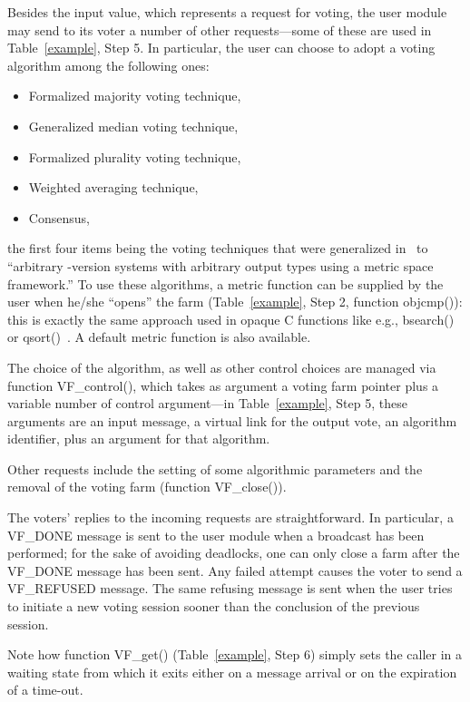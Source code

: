 \documentclass[11pt]{article}
\begin{document}
Besides the input value, which represents a request for voting,
the user module may send to its voter a number of other requests---some 
of these are used in Table~\ref{example}, Step 5. In particular, the user
can choose to adopt a voting algorithm among the following ones:
\begin{itemize}
\item Formalized majority voting technique,
\item Generalized median voting technique,
\item Formalized plurality voting technique,
\item Weighted averaging technique,
\item Consensus,
\end{itemize}
the first four items being the voting techniques that were generalized in~\cite{LoCE89}
to ``arbitrary -version systems with arbitrary output types 
using a metric space framework.''
To use these algorithms, a metric function can be supplied by the
user when he/she ``opens'' the farm (Table~\ref{example}, Step 2, function {\sf objcmp()}):
this is exactly the same approach used in opaque C functions like
e.g., {\sf bsearch()} or {\sf qsort()}~\cite{KeRi2}.
A default metric function is also available.

The choice of the algorithm, as well as other control choices are managed via function
{\sf VF\_control()}, which takes as argument a voting farm pointer plus a variable number
of control argument---in Table~\ref{example}, Step 5, these arguments are
an input message, a virtual link for the output vote, an algorithm identifier, plus
an argument for that algorithm.


Other requests include the setting of some algorithmic parameters
and the removal of the voting farm (function {\sf VF\_close()}).



The voters' replies to the incoming requests are straightforward. In particular,
a {\sf VF\_DO\-NE} message is sent to the user module when a broadcast
has been performed; for the sake of avoiding deadlocks, one can only
close a farm after the {\sf VF\_DONE} message
has been sent.
Any failed attempt causes the voter to send a {\sf VF\_REFUSED}
message.
The same refusing message is sent when the user tries to
initiate a new voting session sooner than the conclusion of the previous session.

Note how function {\sf VF\_get()} (Table~\ref{example}, Step 6)
simply sets the caller in a waiting state from which it exits either on a
message arrival or on the expiration of a time-out.
\end{document}

